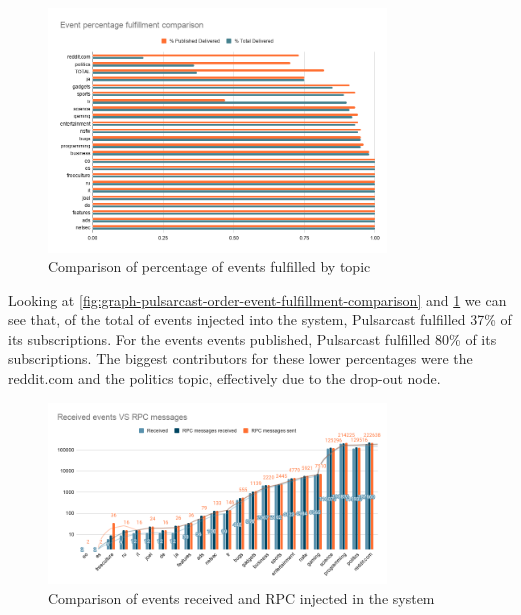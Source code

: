 \begin{figure}[hb!]
  \centering
  \includegraphics[width=0.8\textwidth]{img/graph-pulsarcast-order-event-percentage-fulfillment-comparison.png}
  \caption{Comparison of percentage of events fulfilled by topic}
  \label{fig:graph-pulsarcast-order-event-percentage-fulfillment-comparison}
\end{figure}

Looking at \ref{fig:graph-pulsarcast-order-event-fulfillment-comparison} and
\ref{fig:graph-pulsarcast-order-event-percentage-fulfillment-comparison} we can
see that, of the total of events injected into the system, Pulsarcast fulfilled 37\% of
its subscriptions. For the events events published, Pulsarcast fulfilled 80\%
of its subscriptions. The biggest contributors for these lower percentages were
the reddit.com and the politics topic, effectively due to the drop-out node.

\begin{figure}[hb!]
  \centering
  \includegraphics[width=0.8\textwidth]{img/graph-pulsarcast-order-rpc.png}
  \caption{Comparison of events received and RPC injected in the system}
  \label{fig:graph-pulsarcast-order-rpc}
\end{figure}


